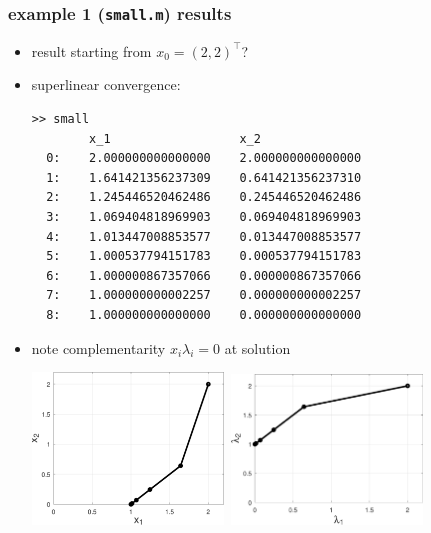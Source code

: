 \documentclass[10pt,hyperref,dvipsnames]{beamer}
\begin{document}
\begin{frame}[fragile]
\frametitle{example 1 (\texttt{small.m}) results}

\begin{itemize}
\item result starting from $x_0=(2,2)^\top$?
\item superlinear convergence:
\begin{Verbatim}[fontsize=\scriptsize]
>> small
        x_1                  x_2
  0:    2.000000000000000    2.000000000000000
  1:    1.641421356237309    0.641421356237310
  2:    1.245446520462486    0.245446520462486
  3:    1.069404818969903    0.069404818969903
  4:    1.013447008853577    0.013447008853577
  5:    1.000537794151783    0.000537794151783
  6:    1.000000867357066    0.000000867357066
  7:    1.000000000002257    0.000000000002257
  8:    1.000000000000000    0.000000000000000
\end{Verbatim}

\item note complementarity $x_i\lambda_i=0$ at solution

\medskip
\hfill
\mbox{\includegraphics[width=0.4\textwidth]{figs/small.pdf} \qquad \includegraphics[width=0.4\textwidth]{figs/smalldual.pdf}}
\end{itemize}
\end{frame}
\end{document}
